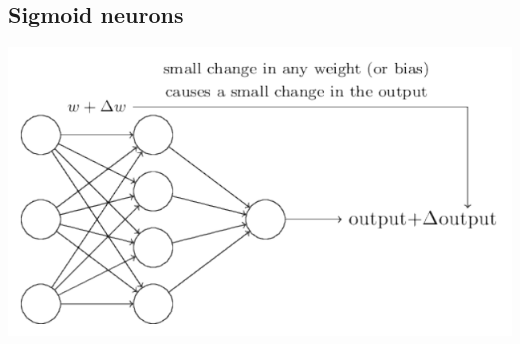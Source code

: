 \documentclass[ %
    a4paper,    %
    amsmath,    %
    itemph,     %
]{oblivoir}     %
\begin{document}
\subsection{Sigmoid neurons}

\begin{center}
\includegraphics[scale=0.7]{image/7_continuity}
\end{center}
\end{document}
